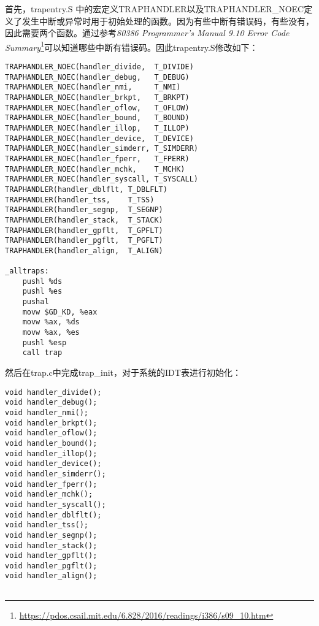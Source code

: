 \begin{exerciseSolution}{4}
    \par 首先，trapentry.S 中的宏定义TRAPHANDLER以及TRAPHANDLER\_NOEC定义了发生中断或异常时用于初始处理的函数。因为有些中断有错误码，有些没有，因此需要两个函数。通过参考\textit{80386 Programmer’s Manual 9.10 Error Code Summary}\footnote{\url{https://pdos.csail.mit.edu/6.828/2016/readings/i386/s09_10.htm}}可以知道哪些中断有错误码。因此trapentry.S修改如下：

\begin{lstlisting}
TRAPHANDLER_NOEC(handler_divide,  T_DIVIDE)
TRAPHANDLER_NOEC(handler_debug,   T_DEBUG)
TRAPHANDLER_NOEC(handler_nmi,     T_NMI)
TRAPHANDLER_NOEC(handler_brkpt,   T_BRKPT)
TRAPHANDLER_NOEC(handler_oflow,   T_OFLOW)
TRAPHANDLER_NOEC(handler_bound,   T_BOUND)
TRAPHANDLER_NOEC(handler_illop,   T_ILLOP)
TRAPHANDLER_NOEC(handler_device,  T_DEVICE)
TRAPHANDLER_NOEC(handler_simderr, T_SIMDERR)
TRAPHANDLER_NOEC(handler_fperr,   T_FPERR)
TRAPHANDLER_NOEC(handler_mchk,    T_MCHK)
TRAPHANDLER_NOEC(handler_syscall, T_SYSCALL)
TRAPHANDLER(handler_dblflt, T_DBLFLT)
TRAPHANDLER(handler_tss,    T_TSS)
TRAPHANDLER(handler_segnp,  T_SEGNP)
TRAPHANDLER(handler_stack,  T_STACK)
TRAPHANDLER(handler_gpflt,  T_GPFLT)
TRAPHANDLER(handler_pgflt,  T_PGFLT)
TRAPHANDLER(handler_align,  T_ALIGN)

_alltraps:
    pushl %ds
    pushl %es
    pushal
    movw $GD_KD, %eax
    movw %ax, %ds
    movw %ax, %es
    pushl %esp
    call trap
\end{lstlisting}
\par 然后在trap.c中完成trap\_init，对于系统的IDT表进行初始化：
\begin{lstlisting}
void handler_divide();
void handler_debug();
void handler_nmi();
void handler_brkpt();
void handler_oflow();
void handler_bound();
void handler_illop();
void handler_device();
void handler_simderr();
void handler_fperr();
void handler_mchk();
void handler_syscall();
void handler_dblflt();
void handler_tss();
void handler_segnp();
void handler_stack();
void handler_gpflt();
void handler_pgflt();
void handler_align();


\end{lstlisting}
\end{exerciseSolution}
